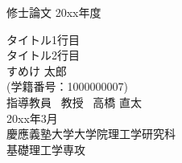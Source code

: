 \documentclass[Main]{subfiles}
\begin{document}
\begin{titlepage}
    {\LARGE 修士論文} \hspace{\fill} {\LARGE 20xx年度}
    \vspace{2cm}
    \begin{center}
        {\huge タイトル1行目\\タイトル2行目} \\
        \vspace{2cm}
        {\Huge すめけ 太郎} \\
        \vspace{0.5cm}
        {\LARGE (学籍番号：1000000007)} \\
        \vspace{5cm}
        {\LARGE 指導教員\,\,\,  教授\,\,\,  高橋 直太} \\
        \vspace{3cm}
        {\LARGE 20xx年3月} \\
        \vspace{1cm}
        {\LARGE 慶應義塾大学大学院理工学研究科} \\
        {\LARGE 基礎理工学専攻} \\
    \end{center}
\end{titlepage}
\end{document}
